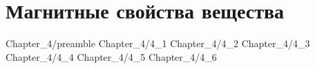\chapter{Магнитные свойства вещества}

 {Chapter_4/preamble}
 {Chapter_4/4_1}
 {Chapter_4/4_2}
 {Chapter_4/4_3}
 {Chapter_4/4_4}
 {Chapter_4/4_5}
 {Chapter_4/4_6}